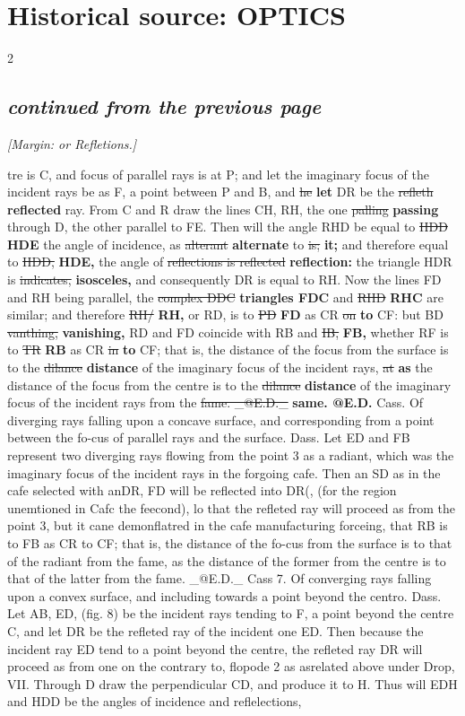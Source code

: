 \documentclass[10pt]{article}
\begin{document}
\section*{Historical source: OPTICS}
\begin{multicols}{2}
\subsection*{\textit{continued from the previous page}}
{\small\itshape [Margin: or Refletions.]}\par
tre is C, and focus of parallel rays is at P; and let the imaginary focus of the incident rays be as F, a point between P and B, and \sout{he} \textbf{let} DR be the \sout{refleth} \textbf{reflected} ray. From C and R draw the lines CH, RH, the one \sout{palling} \textbf{passing} through D, the other parallel to FE. Then will the angle RHD be equal to \sout{HDD} \textbf{HDE} the angle of incidence, as \sout{alterant} \textbf{alternate} to \sout{is;} \textbf{it;} and therefore equal to \sout{HDD,} \textbf{HDE,} the angle of \sout{reflections is reflected} \textbf{reflection:} the triangle HDR is \sout{indicates,} \textbf{isosceles,} and consequently DR is equal to RH. Now the lines FD and RH being parallel, the \sout{complex DDC} \textbf{triangles FDC} and \sout{RHD} \textbf{RHC} are similar; and therefore \sout{RH/} \textbf{RH,} or RD, is to \sout{PD} \textbf{FD} as CR \sout{on} \textbf{to} CF: but BD \sout{vanthing,} \textbf{vanishing,} RD and FD coincide with RB and \sout{IB,} \textbf{FB,} whether RF is to \sout{TR} \textbf{RB} as CR \sout{in} \textbf{to} CF; that is, the distance of the focus from the surface is to the \sout{dilance} \textbf{distance} of the imaginary focus of the incident rays, \sout{at} \textbf{as} the distance of the focus from the centre is to the \sout{dilance} \textbf{distance} of the imaginary focus of the incident rays from the \sout{fame. \_@E.D.\_} \textbf{same. @E.D.} Cass. Of diverging rays falling upon a concave surface, and corresponding from a point between the fo-cus of parallel rays and the surface. Dass. Let ED and FB represent two diverging rays flowing from the point 3 as a radiant, which was the imaginary focus of the incident rays in the forgoing cafe. Then an SD as in the cafe selected with anDR, FD will be reflected into DR(, (for the region unemtioned in Cafc the feecond), lo that the refleted ray will proceed as from the point 3, but it cane demonflatred in the cafe manufacturing forceing, that RB is to FB as CR to CF; that is, the distance of the fo-cus from the surface is to that of the radiant from the fame, as the distance of the former from the centre is to that of the latter from the fame. \_@E.D.\_ Cass 7. Of converging rays falling upon a convex surface, and including towards a point beyond the centro. Dass. Let AB, ED, (fig. 8) be the incident rays tending to F, a point beyond the centre C, and let DR be the refleted ray of the incident one ED. Then because the incident ray ED tend to a point beyond the centre, the refleted ray DR will proceed as from one on the contrary to, flopode 2 as asrelated above under Drop, VII. Through D draw the perpendicular CD, and produce it to H. Thus will EDH and HDD be the angles of incidence and reflelections, 
\end{multicols}
\end{document}
